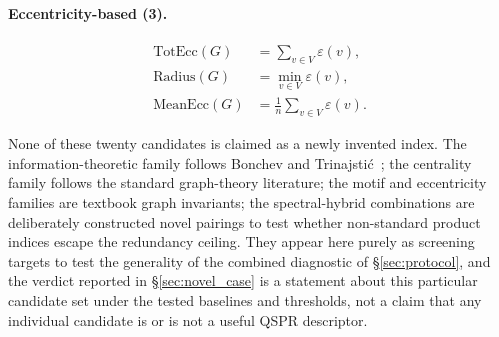 \documentclass[STIX1COL]{WileyNJDv5}
\theoremstyle{definition}
\begin{document}
\paragraph{Eccentricity-based (3).}
\begin{align*}
\mathrm{TotEcc}(G) &= \sum_{v \in V} \varepsilon(v), \\
\mathrm{Radius}(G) &= \min_{v \in V} \varepsilon(v), \\
\mathrm{MeanEcc}(G) &= \frac{1}{n}\sum_{v \in V} \varepsilon(v).
\end{align*}

None of these twenty candidates is claimed as a newly invented
index. The information-theoretic family follows Bonchev and
Trinajsti\'c~\cite{Gutman2013Degree, TodeschiniConsonniHandbook};
the centrality family follows the standard graph-theory
literature; the motif and eccentricity families are textbook
graph invariants; the spectral-hybrid combinations are
deliberately constructed novel pairings to test whether
non-standard product indices escape the redundancy ceiling. They
appear here purely as screening targets to test the generality
of the combined diagnostic of \S\ref{sec:protocol}, and the
verdict reported in \S\ref{sec:novel_case} is a statement about
this particular candidate set under the tested baselines and
thresholds, not a claim that any individual candidate is or is
not a useful QSPR descriptor.



\end{document}

